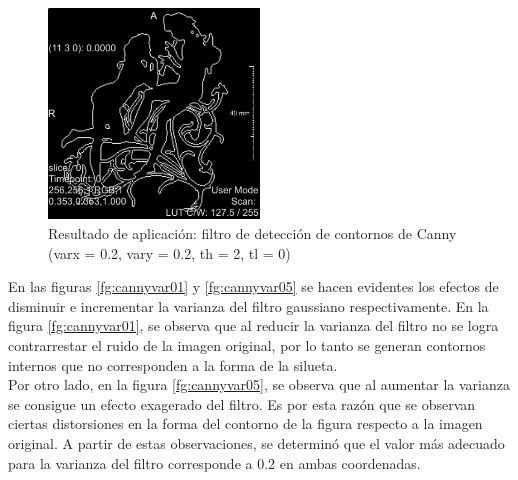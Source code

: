 \documentclass{article}
\begin{document}
\begin{figure}[ht]
\begin{center}
\includegraphics[width=0.5\textwidth]{4sintesis/canny.png} %
\caption{Resultado de aplicación: filtro de detección de contornos de Canny (varx = 0.2, vary = 0.2, th = 2, tl = 0)}
\label{fg:resCanny}
\end{center}
\end{figure}
\FloatBarrier

En las figuras \ref{fg:cannyvar01} y \ref{fg:cannyvar05} se hacen evidentes los efectos de disminuir e incrementar la varianza del filtro gaussiano respectivamente. En la figura \ref{fg:cannyvar01}, se observa que al reducir la varianza del filtro no se logra contrarrestar el ruido de la imagen original, por lo tanto se generan contornos internos que no corresponden a la forma de la silueta. \\
Por otro lado, en la figura \ref{fg:cannyvar05}, se observa que al aumentar la varianza se consigue un efecto exagerado del filtro. Es por esta razón que se observan ciertas distorsiones en la forma del contorno de la figura respecto a la imagen original. A partir de estas observaciones, se determinó que el valor más adecuado para la varianza del filtro corresponde a 0.2 en ambas coordenadas.
\end{document}
